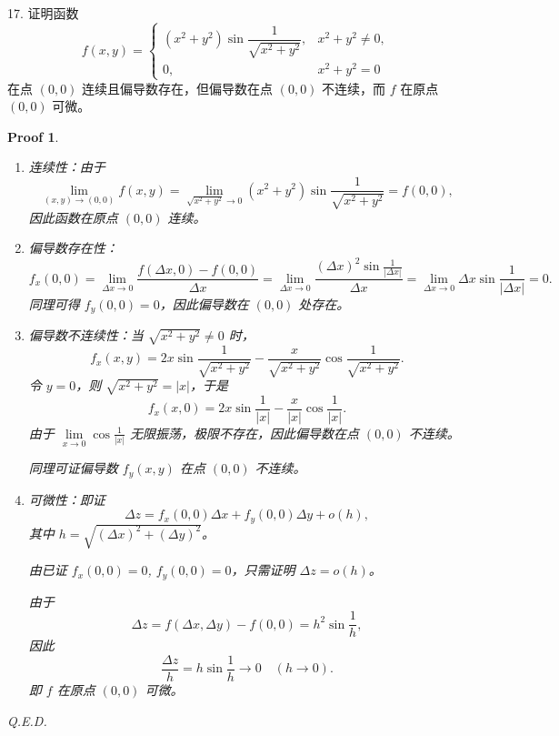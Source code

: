 \documentclass[a4paper,12pt]{article}
\newtheorem*{pf}{Proof}
\begin{document}
17. 证明函数
$$
    f(x,y) =
    \begin{cases}
        (x^2 + y^2)\sin \dfrac{1}{\sqrt{x^2 + y^2}}, & x^2 + y^2 \neq 0, \\
        0,                                           & x^2 + y^2 = 0
    \end{cases}
$$
在点 $(0,0)$ 连续且偏导数存在，但偏导数在点 $(0,0)$ 不连续，而 $f$ 在原点 $(0,0)$ 可微。
\begin{pf}
    \begin{enumerate}
        \item 连续性：由于
              $$
                  \lim_{(x,y) \to (0,0)} f(x,y) = \lim_{\sqrt{x^2+y^2} \to 0} (x^2 + y^2)\sin\frac{1}{\sqrt{x^2 + y^2}} = f(0,0),
              $$
              因此函数在原点 $(0,0)$ 连续。

        \item 偏导数存在性：
              $$
                  f_x(0,0) = \lim_{\Delta x \to 0}\frac{f(\Delta x,0) - f(0,0)}{\Delta x} = \lim_{\Delta x \to 0}\frac{(\Delta x)^2\sin\frac{1}{|\Delta x|}}{\Delta x} = \lim_{\Delta x \to 0}\Delta x\sin\frac{1}{|\Delta x|} = 0.
              $$
              同理可得 $f_y(0,0) = 0$，因此偏导数在 $(0,0)$ 处存在。

        \item 偏导数不连续性：当 $\sqrt{x^2+y^2} \neq 0$ 时，
              $$
                  f_x(x,y) = 2x\sin\frac{1}{\sqrt{x^2 + y^2}} - \frac{x}{\sqrt{x^2+y^2}}\cos\frac{1}{\sqrt{x^2+y^2}}.
              $$
              令 $y = 0$，则 $\sqrt{x^2+y^2} = |x|$，于是
              $$
                  f_x(x,0) = 2x\sin\frac{1}{|x|} - \frac{x}{|x|}\cos\frac{1}{|x|}.
              $$
              由于 $\lim\limits_{x \to 0}\cos\frac{1}{|x|}$ 无限振荡，极限不存在，因此偏导数在点 $(0,0)$ 不连续。

              同理可证偏导数 $f_y(x,y)$ 在点 $(0,0)$ 不连续。

        \item 可微性：即证
              $$
                  \Delta z = f_x(0,0)\Delta x + f_y(0,0)\Delta y + o(h),
              $$
              其中 $h = \sqrt{(\Delta x)^2 + (\Delta y)^2}$。

              由已证 $f_x(0,0) = 0$, $f_y(0,0) = 0$，只需证明 $\Delta z = o(h)$。

              由于
              $$
                  \Delta z = f(\Delta x,\Delta y) - f(0,0) = h^2\sin\frac{1}{h},
              $$
              因此
              $$
                  \frac{\Delta z}{h} = h\sin\frac{1}{h} \to 0 \quad (h \to 0).
              $$
              即 $f$ 在原点 $(0,0)$ 可微。
    \end{enumerate}

    Q.E.D.
\end{pf}
\end{document}
